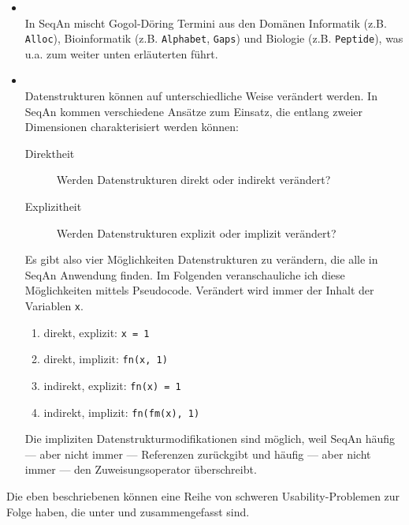 \begin{description}
\begin{itemize}
    \item[\codebullet{apiua://code/-9223372036854774848}] \textbf{} \\
    In SeqAn mischt Gogol-Döring Termini aus den Domänen Informatik (z.B. \texttt{Alloc}), Bioinformatik (z.B. \texttt{Alphabet}, \texttt{Gaps}) und Biologie (z.B. \texttt{Peptide}), was u.a. zum weiter unten erläuterten  führt.
    
    \item[\codebullet{apiua://code/-9223372036854774838}] \textbf{} \\
    Datenstrukturen können auf unterschiedliche Weise verändert werden. In SeqAn kommen verschiedene Ansätze zum Einsatz, die entlang zweier Dimensionen charakterisiert werden können:
    \begin{description}
      \item[Direktheit] Werden Datenstrukturen direkt oder indirekt verändert?
      \item[Explizitheit] Werden Datenstrukturen explizit oder implizit verändert?
    \end{description}
    
    Es gibt also vier Möglichkeiten Datenstrukturen zu verändern, die alle in SeqAn Anwendung finden. Im Folgenden veranschauliche ich diese Möglichkeiten mittels Pseudocode. Verändert wird immer der Inhalt der Variablen \texttt{x}.\label{sec:datenstrukturmodifikation-beispiele}
    \begin{enumerate}
      \item direkt, explizit: \texttt{x = 1}
      \item direkt, implizit: \texttt{fn(x, 1)}
      \item indirekt, explizit: \texttt{fn(x) = 1}
      \item indirekt, implizit: \texttt{fn(fm(x), 1)}
    \end{enumerate}
    
    Die impliziten Datenstrukturmodifikationen sind möglich, weil SeqAn häufig --- aber nicht immer --- Referenzen zurückgibt und häufig --- aber nicht immer --- den Zuweisungsoperator überschreibt.
  \end{itemize}
  
  Die eben beschriebenen  können eine Reihe von schweren Usability-Problemen zur Folge haben, die unter  und  zusammengefasst sind.
\end{description}

